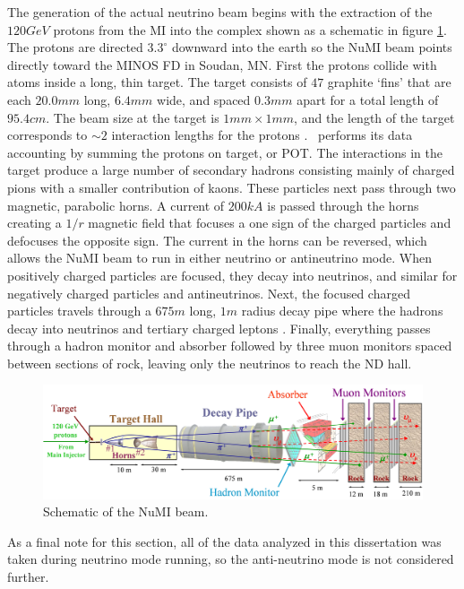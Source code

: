 The generation of the actual neutrino beam begins with the extraction of the $120\unit{GeV}$ protons from the MI into the complex shown as a schematic in figure \ref{fig:FNAL_NuMI}. The protons are directed $3.3^\circ$ downward into the earth so the NuMI beam points directly toward the MINOS FD in Soudan, MN. First the protons collide with atoms inside a long, thin target. The target consists of $47$ graphite `fins' that are each $20.0\unit{mm}$ long, $6.4\unit{mm}$ wide, and spaced $0.3\unit{mm}$ apart for a total length of $95.4\unit{cm}$. The beam size at the target is $1\unit{mm} \times 1\unit{mm}$, and the length of the target corresponds to ${\sim}2$ interaction lengths for the protons \cite{ref:TDRNuMI}. \nova~performs its data accounting by summing the protons on target, or POT. The interactions in the target produce a large number of secondary hadrons consisting mainly of charged pions with a smaller contribution of kaons. These particles next pass through two magnetic, parabolic horns. A current of $200\unit{kA}$ is passed through the horns creating a $1/r$ magnetic field that focuses a one sign of the charged particles and defocuses the opposite sign. The current in the horns can be reversed, which allows the NuMI beam to run in either neutrino or antineutrino mode. When positively charged particles are focused, they decay into neutrinos, and similar for negatively charged particles and antineutrinos. Next, the focused charged particles travels through a $675\unit{m}$ long, $1\unit{m}$ radius decay pipe where the hadrons decay into neutrinos and tertiary charged leptons \cite{ref:TDRNOvA}. Finally, everything passes through a hadron monitor and absorber followed by three muon monitors spaced between sections of rock, leaving only the neutrinos to reach the ND hall.
\begin{figure}[htb]
  \centering
  \includegraphics[width=1\textwidth]{figures/FNAL_NuMI.png}
  \caption[NuMI Beam Schematic]{Schematic of the NuMI beam.}
  \label{fig:FNAL_NuMI}
\end{figure}

As a final note for this section, all of the data analyzed in this dissertation was taken during neutrino mode running, so the anti-neutrino mode is not considered further.

